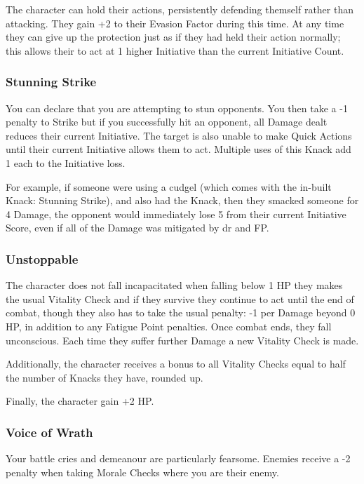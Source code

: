 \begin{multicols}{2}
The character can hold their actions, persistently defending themself rather than attacking. They gain +2 to their Evasion Factor during this time. At any time they can give up the protection just as if they had held their action normally; this allows their to act at 1 higher Initiative than the current Initiative Count.

\subsubsection{Stunning Strike}\label{stunningstrike}

You can declare that you are attempting to stun opponents.
You then take a -1 penalty to Strike but if you successfully hit an opponent, all Damage dealt reduces their current Initiative.
The target is also unable to make Quick Actions until their current Initiative allows them to act.
Multiple uses of this Knack add 1 each to the Initiative loss.

For example, if someone were using a cudgel (which comes with the in-built Knack: Stunning Strike), and also had the Knack, then they smacked someone for 4 Damage, the opponent would immediately lose 5 from their current Initiative Score, even if all of the Damage was mitigated by \gls{dr} and FP.

\subsubsection{Unstoppable}

The character does not fall incapacitated when falling below 1 HP they makes the usual Vitality Check and if they survive they continue to act until the end of combat, though they also has to take the usual penalty: -1 per Damage beyond 0 HP, in addition to any Fatigue Point penalties. Once combat ends, they fall unconscious. Each time they suffer further Damage a new Vitality Check is made.

Additionally, the character receives a bonus to all Vitality Checks equal to half the number of Knacks they have, rounded up.

Finally, the character gain +2 HP.

\subsubsection{Voice of Wrath}

Your battle cries and demeanour are particularly fearsome. Enemies receive a -2 penalty when taking Morale Checks where you are their enemy.

\end{multicols}

